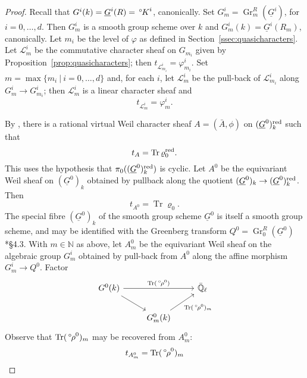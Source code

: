 \documentclass[10pt]{amsart}
\theoremstyle{plain}
\theoremstyle{definition}
\newcommand{\NN}{{\mathbb{N}}}
\newcommand{\EE}{\mathbb{\bar Q}_\ell}
\newcommand{\bFq}{\bar{k}}
\newcommand{\Fq}{k}
\DeclareMathOperator{\Gr}{Gr}
\DeclareMathOperator{\trace}{Tr}
\newcommand{\tq}{{\ \vert\ }}
\newcommand{\trFrob}[1]{t_{#1}}
\newcommand{\cs}[1]{{\mathcal{#1}}}
\newcommand{\oK}{{\,^\circ \hskip-1pt K}}
\newcommand{\orho}{{\,^\circ \hskip-1pt \rho}}
\begin{document}
\begin{proof}
Recall that $G^i(\Fq) = \underline{G}^i(R) = \oK^i$, canonically.
Set $G_m^i = \Gr_m^{R}(\underline{G}^i)$, for $i=0, \ldots, d$.
Then $G_m^i$ is a smooth group scheme over $\Fq$ and $G_m^i(\Fq) = \underline{G}^i(R_m)$, canonically.
Let $m_i$ be the level of $\varphi$ as defined in Section~\ref{ssec:quasicharacters}.
Let $\cs{L}^i_m$ be the commutative character sheaf on $G_{m_i}$ given by Proposition~\ref{prop:quasicharacters}; then
$\trFrob{\cs{L}^i_{m_i}} = \varphi^i_{m_i}$.
Set $m = \max\{ m_i \tq i=0, \ldots ,d\}$ and, for each $i$, let $\cs{L}^i_{m}$ be the pull-back of $\cs{L}^i_{m_i}$ along $G^i_{m} \to G^i_{m_i}$; then $\cs{L}^i_{m}$ is a linear character sheaf and
\[
\trFrob{\cs{L}^i_{m}} = \varphi^i_{m}.
\]

By \cite{lusztig:disconnected1}, there is a rational virtual Weil character sheaf $A = ({\bar A},\phi)$ on $(\underline{G}^0)_\Fq^\reductive$ such that 
\[
\trFrob{A} = \trace \varrho_0^\reductive.
\]
This uses the hypothesis that $\pi_0((\underline{G}^0)_\Fq^\reductive)$ is cyclic.
%
Let $A^0$ be the equivariant Weil sheaf on $(\underline{G}^0)_\Fq$ obtained by pullback along the quotient $(\underline{G}^0)_\Fq \to (\underline{G}^0)_\Fq^\reductive$.
Then 
\[
\trFrob{A^0} = \trace \varrho_0.
\]
The special fibre $(\underline{G}^0)_\Fq$ of the smooth group scheme $\underline{G}^0$ is itself a smooth group scheme, and may be identified with the Greenberg transform $Q^0 = \Gr^{R}_0(\underline{G}^0)$ \cite{cunningham-roe:13a}*{\S 4.3}. 
With $m\in \NN$ as above, let ${A}_m^0$ be the equivariant Weil sheaf on the algebraic group $G_m^i$ obtained by pull-back from $A^0$ along the affine morphism $G_m^i \to Q^0$.
Factor
\begin{equation}\label{eqn:tracerho}
\begin{tikzcd}
G^0(\Fq) \arrow{rr}{\trace(\orho^0)} \arrow{rd} && \EE \\
& G_m^0(\Fq) \arrow{ru}[swap]{\trace(\orho^0)_m} 
\end{tikzcd}
\end{equation}
Observe that $\trace(\orho^0)_m$ may be recovered from ${A}_m^0$:
\[
\trFrob{{A}^0_m} = \trace(\orho^0)_m
\]


\end{proof}
\end{document}
